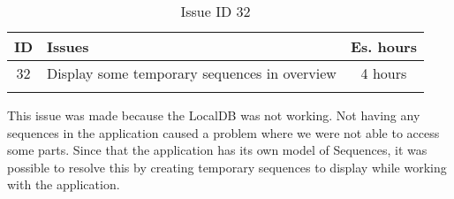 \begin{longtable} { | c | p{12cm} | c | } 
\hline
	ID 	&	Issues	&		 Es. hours \\\hline
	32 	&	Display some temporary sequences in overview	&	4 hours \\\hline
\caption{Issue ID 32}
\label{tab:spr2_fakesequences}
\end{longtable}

This issue was made because the LocalDB was not working. Not having any sequences in the application caused a problem where we were not able to access some parts. Since that the application has its own model of Sequences, it was possible to resolve this by creating temporary sequences to display while working with the application.